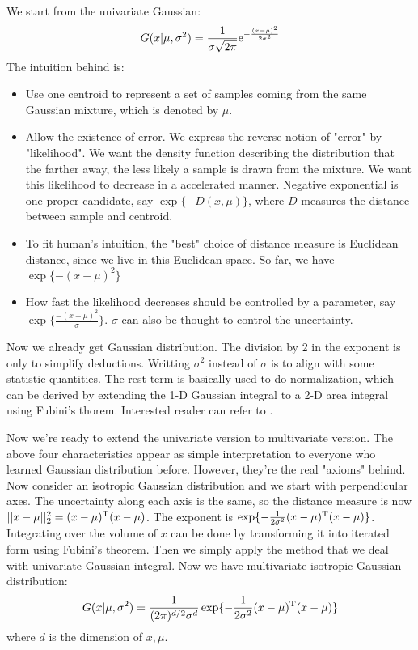 We start from the univariate Gaussian\cite{wiki_gaussian}:
\begin{equation}
	G(x|\mu, \sigma^2) = \frac{1}{\sigma\sqrt{2\pi}}{\rm e}^{-\frac{(x-\mu)^2}{2\sigma^2}}
\end{equation}
The intuition behind is:
\begin{itemize}
	\item Use one centroid to represent a set of samples
	coming from the same Gaussian mixture, which 
	is denoted by $\mu$. 
	\item Allow the existence of error. We express the reverse notion
	of "error" by "likelihood". We want the density function describing 
	the distribution that the farther away, the less likely a sample is 
	drawn from the mixture. We want this likelihood to decrease 
	in a accelerated manner. Negative exponential is one proper candidate, 
	say  $\exp\{-D(x,\mu)\}$, where $D$ measures the distance between 
	sample and centroid. 
	\item To fit human's intuition, the "best" choice of distance measure 
	is Euclidean distance, since we live in this Euclidean space. So far, 
	we have $\exp\{-(x-\mu)^2\}$
	\item How fast the likelihood decreases should be controlled by a 
	parameter, say $\exp\{\frac{-(x-\mu)^2}{\sigma}\}$. 
	$\sigma$ can also be thought to control the uncertainty. 
\end{itemize}
Now we already get Gaussian distribution. The division by 2 in the exponent 
is only to simplify deductions. Writting $\sigma^2$ instead of $\sigma$ is 
to align with some statistic quantities. The rest term is basically used 
to do normalization, which can be derived by extending the 1-D
Gaussian integral to a 2-D area integral using 
Fubini's thorem\cite{wiki_fubini}. Interested reader can refer to  
\cite{wiki_gaussian_integral}. 
	
Now we're ready to extend the univariate version to multivariate version. 
The above four characteristics appear as simple interpretation to 
everyone who learned Gaussian distribution before. However, they're 
the real "axioms" behind. Now consider an isotropic Gaussian distribution 
and we start with perpendicular axes. The uncertainty along each axis is 
the same, so the distance measure is now $||x-\mu||_2^2=(x-\mu)^\mathrm{T}(x-\mu)$. 
The exponent is $\exp\{ -\frac{1}{2\sigma^2} (x-\mu)^\mathrm{T}(x-\mu)\}$. 
Integrating over the volume of $x$ can be done by transforming it 
into iterated form using Fubini's theorem. Then we simply apply the method 
that we deal with univariate Gaussian integral. Now we have 
multivariate isotropic Gaussian distribution:
\begin{equation}
	\label{eq:gaussian_iso}
	G(x|\mu, \sigma^2) = \frac{1}{(2\pi)^{d/2}\sigma^d}
	\exp\{ -\frac{1}{2\sigma^2} (x-\mu)^\mathrm{T}(x-\mu)\}
\end{equation}
where $d$ is the dimension of $x,\mu$. 


